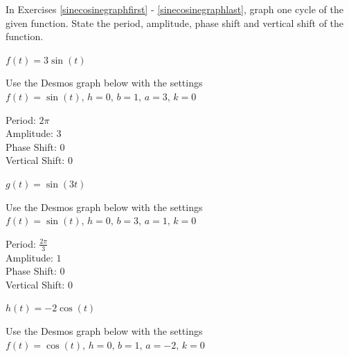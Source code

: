 \documentclass{ximera}
\begin{document}
	\author{Stitz-Zeager}


\begin{question}
In Exercises \ref{sinecosinegraphfirst} - \ref{sinecosinegraphlast}, graph one cycle of the given function.  State the period, amplitude, phase shift and vertical shift of the function.

\begin{problem} \label{sinecosinegraphfirst}
$f(t) = 3\sin(t)$ 

\begin{solution}
Use the Desmos graph below with the settings $f(t)=\sin(t),\,h=0,\,b=1,\,a=3,\,k=0$

\begin{center} 
\end{center}

Period: $2\pi$\\
Amplitude: $3$\\
Phase Shift: $0$\\
Vertical Shift: $0$\\
\end{solution}
\end{problem}

\begin{problem}
$g(t) = \sin(3t)$

\begin{solution}
Use the Desmos graph below with the settings $f(t)=\sin(t),\,h=0,\,b=3,\,a=1,\,k=0$

\begin{center} 
\end{center}

Period: $\frac{2\pi}{3}$\\
Amplitude: $1$\\
Phase Shift: $0$\\
Vertical Shift: $0$\\
\end{solution}
\end{problem}

\begin{problem}
$h(t)  = -2\cos(t)$

\begin{solution}
Use the Desmos graph below with the settings $f(t)=\cos(t),\,h=0,\,b=1,\,a=-2,\,k=0$

\begin{center} 
\end{center}


\end{solution}
\end{problem}
\end{question}
\end{document}
